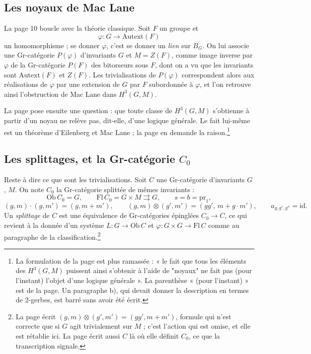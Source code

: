 \documentclass[11pt,a4paper]{article}
\begin{document}
\subsection*{Les noyaux de Mac Lane}

La page 10 boucle avec la théorie classique. Soit $F$ un groupe et
\[
\varphi : G \longrightarrow \mathrm{Autext}(F)
\]
un homomorphisme ; se donner $\varphi$, c'est se donner un \emph{lien} sur
$B_{G}$. On lui associe une Gr-catégorie $P(\varphi)$ d'invariants $G$ et $M =
Z(F)$, comme image inverse par $\varphi$ de la Gr-catégorie $P(F)$ des
bitorseurs sous $F$, dont on a vu que les invariants sont $\mathrm{Autext}(F)$
et $Z(F)$. Les trivialisations de $P(\varphi)$ correspondent alors aux
réalisations de $\varphi$ par une extension de $G$ par $F$ subordonnée à
$\varphi$, et l'on retrouve ainsi l'obstruction de Mac Lane dans $H^{3}(G,M)$.

La page pose ensuite une question : que
toute classe de $H^{3}(G,M)$ s'obtienne à partir d'un noyau ne relève pas,
dit-elle, d'une logique générale. Le fait lui-même est un théorème d'Eilenberg et
Mac Lane ; la page en demande la raison.\footnote{La formulation de la page est plus ramassée : « le fait que
tous les éléments des $H^{3}(G,M)$ puissent ainsi s'obtenir à l'aide de
"noyaux" ne fait pas (pour l'instant) l'objet d'une logique générale ». La
parenthèse « (pour l'instant) » est de la page. Un paragraphe b), qui devait
donner la description en termes de 2-gerbes, est barré sans avoir été écrit.}

\subsection*{Les splittages, et la Gr-catégorie $C_{0}$}

Reste à dire ce que sont les trivialisations. Soit $C$ une Gr-catégorie
d'invariants $G$, $M$. On note $C_{0}$ la Gr-catégorie splittée de mêmes
invariants :
\[
\mathrm{Ob}\,C_{0} = G, \qquad
\mathrm{Fl}\,C_{0} = G \times M \rightrightarrows G, \qquad
s = b = \mathrm{pr}_{1},
\]
\[
(g,m) \cdot (g,m') = (g, m+m'), \qquad
(g,m) \otimes (g',m') = (gg',\, m + g \cdot m'), \qquad
a_{g,g',g''} = \mathrm{id}.
\]
Un \emph{splittage} de $C$ est une équivalence de Gr-catégories épinglées
$C_{0} \to C$, ce qui revient à la donnée d'un système $L : G \to
\mathrm{Ob}\,C$ et $\varphi : G \times G \to \mathrm{Fl}\,C$ comme au
paragraphe de la classification.\footnote{La page écrit $(g,m) \otimes
(g',m') = (gg', m+m')$, formule qui n'est correcte que si $G$ agit
trivialement sur $M$ ; c'est l'action qui est omise, et elle est rétablie
ici. La page écrit aussi $C$ là où elle définit $C_{0}$, ce que la
transcription signale.}
\end{document}

